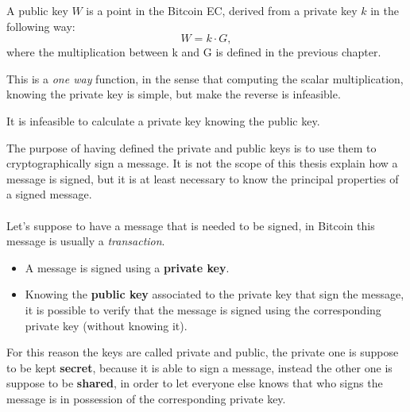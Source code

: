 \begin{definition}
	A public key $W$ is a point in the Bitcoin EC, derived from a private key $k$ in the following way: \\
	\begin{equation}
	W=k\cdot G,
	\end{equation}
	where the multiplication between k and G is defined in the previous chapter.
\end{definition}
This is a \textit{one way} function, in the sense that computing the scalar multiplication, knowing the private key is simple, but make the reverse is infeasible.
\begin{remark}
	It is infeasible to calculate a private key knowing the public key.
\end{remark}
The purpose of having defined the private and public keys is to use them to cryptographically sign a message. It is not the scope of this thesis explain how a message is signed, but it is at least necessary to know the principal properties of a signed message.
\\ \\
Let's suppose to have a message that is needed to be signed, in Bitcoin this message is usually a \textit{transaction}.

\begin{itemize}
	\item A message is signed using a \textbf{private key}.
	\item Knowing the \textbf{public key} associated to the private key that sign the message, it is possible to verify that the message is signed using the corresponding private key (without knowing it).
\end{itemize}
For this reason the keys are called private and public, the private one is suppose to be kept \textbf{secret}, because it is able to sign a message, instead the other one is suppose to be \textbf{shared}, in order to let everyone else knows that who signs the message is in possession of the corresponding private key.





